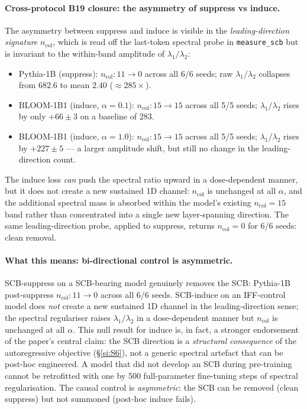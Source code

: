 \documentclass[11pt,a4paper]{article}
\begin{document}
\paragraph{Cross-protocol B19 closure: the asymmetry of suppress vs induce.}
The asymmetry between suppress and induce is visible in the
\emph{leading-direction signature} $n_\mathrm{col}$, which is
read off the last-token spectral probe in
\texttt{measure\_scb} but is invariant to the within-band
amplitude of $\lambda_1/\lambda_2$:
\begin{itemize}\setlength{\itemsep}{0pt}
  \item Pythia-1B (suppress): $n_\mathrm{col}\!:\!11\to 0$
        across all 6/6 seeds; raw $\lambda_1/\lambda_2$
        collapses from $682.6$ to mean $2.40$
        ($\approx 285\!\times\!$).
  \item BLOOM-1B1 (induce, $\alpha=0.1$):
        $n_\mathrm{col}\!:\!15\to 15$ across all 5/5 seeds;
        $\lambda_1/\lambda_2$ rises by only $+66 \pm 3$ on a
        baseline of $283$.
  \item BLOOM-1B1 (induce, $\alpha=1.0$):
        $n_\mathrm{col}\!:\!15\to 15$ across all 5/5 seeds;
        $\lambda_1/\lambda_2$ rises by $+227 \pm 5$ — a larger
        amplitude shift, but still no change in the
        leading-direction count.
\end{itemize}
The induce loss \emph{can} push the spectral ratio upward in a
dose-dependent manner, but it does not create a new sustained
1D channel: $n_\mathrm{col}$ is unchanged at all $\alpha$, and
the additional spectral mass is absorbed within the model's
existing $n_\mathrm{col}\!=\!15$ band rather than concentrated
into a single new layer-spanning direction. The same
leading-direction probe, applied to suppress, returns
$n_\mathrm{col}\!=\!0$ for 6/6 seeds: clean removal.

\paragraph{What this means: bi-directional control is asymmetric.}
SCB-suppress on a SCB-bearing model genuinely removes the SCB:
Pythia-1B post-suppress $n_\mathrm{col}\!:\!11\to 0$ across all
6/6 seeds. SCB-induce on an IFF-control model does \emph{not}
create a new sustained 1D channel in the leading-direction sense;
the spectral regulariser raises $\lambda_1/\lambda_2$ in a
dose-dependent manner but $n_\mathrm{col}$ is unchanged at all
$\alpha$. This null result for induce is, in fact, a stronger
endorsement of the paper's central claim: the SCB direction is a
\emph{structural consequence} of the autoregressive objective
(\S\ref{si:S6}), not a generic spectral artefact that can be
post-hoc engineered. A model that did not develop an SCB during
pre-training cannot be retrofitted with one by 500 full-parameter
fine-tuning steps of spectral regularisation. The causal control
is \emph{asymmetric}: the SCB can be removed (clean suppress) but
not summoned (post-hoc induce fails).
\end{document}
